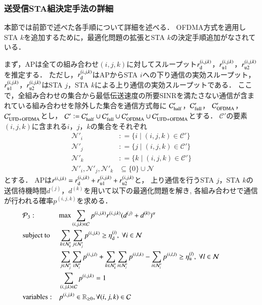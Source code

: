 \documentclass[master]{kuisthesis}		%
\def\equiv{\mathrel{\mathop:}=}
\newcommand{\sijk}{(i,j,k)}
\newcommand{\rijk}{r^{(i,j,k)}}
\newcommand{\mthcd}{{\mathcal C}'}
\newcommand{\mthni}{{\mathcal N}'_i}
\newcommand{\mthnj}{{\mathcal N}'_j}
\newcommand{\mthnk}{{\mathcal N}'_k}
\begin{document}
		\subsubsection{送受信STA組決定手法の詳細}
			本節では前節で述べた各手順について詳細を述べる．
			OFDMA方式を適用しSTA $k$を追加するために，最適化問題の拡張とSTA $k$の決定手順追加がなされている．
			\par
			まず，APは全ての組み合わせ$(i,j,k)$に対してスループット$r^{(i,j,k)}_{\rm d}$，$r^{(i,j,k)}_{\rm u1}$，$r^{(i,j,k)}_{\rm u2}$を推定する．
			ただし，$r^{(i,j,k)}_{\rm d}$はAPからSTA $i$への下り通信の実効スループット，$r^{(i,j,k)}_{\rm u1}$，$r^{(i,j,k)}_{\rm u2}$はSTA $j$，STA $k$による上り通信の実効スループットである．
			ここで，全組み合わせの集合から最低伝送速度の所要SINRを満たさない通信が含まれている組み合わせを除外した集合を通信方式毎に
			${\mathcal C}'_{\rm half}$，${\mathcal C}'_{\rm full}$，
			${\mathcal C}'_{\rm OFDMA}$，${\mathcal C}'_{\rm UFD+OFDMA}$とし，
			${\mathcal C}'\equiv{\mathcal C}'_{\rm half}\cup{\mathcal C}'_{\rm full}\cup{\mathcal C}'_{\rm OFDMA}\cup{\mathcal C}'_{\rm UFD+OFDMA}$とする．
			$\mthcd$の要素$\sijk$に含まれる$i$，$j$，$k$の集合をそれぞれ
			\begin{align}
				\mthni &\equiv\{i\mid\sijk\in\mthcd\}\\
				\mthnj &\equiv\{j\mid\sijk\in\mthcd\}\\
				\mthnk &\equiv\{k\mid\sijk\in\mthcd\}\\
				\mthni,\mthnj,\mthnk&\subseteq \{0\}\cup{\mathcal N}
			\end{align}
			とする．
			APは$\rijk=r^{(i,j,k)}_{\rm d}+r^{(i,j,k)}_{\rm u1}+r^{(i,j,k)}_{\rm u2}$と，
			上り通信を行うSTA $j$，STA $k$の送信待機時間$d^{(j)}$，$d^{(k)}$を用いて以下の最適化問題を解き,
			各組み合わせで通信が行われる確率$p^{(i,j,k)}$を求める．
			\begin{align}
				&{\mathcal P}_3: && {\rm max} \sum_{(i,j,k)\in{\mathcal C}} p^{(i,j,k)}r^{(i,j,k)}(d^{(j)}+d^{(k)})^{\alpha} &&&&&&\\
				&{\rm subject\ to} && \sum_{k\in\mthnk} \sum_{j\in\mthnj} p^{(i,j,k)} \geq \eta_{\rm d}^{(i)},\ \forall i\in {\mathcal N} \label{eq:etad} \\
				&&& \sum_{j\in\mthnj} \sum_{i\mthni} p^{(i,j,l)}+\sum_{k\in\mthnk} \sum_{i\in\mthni} p^{(i,l,k)}- \sum_{i\in\mthni} p^{(i,l,l)} \geq \eta_{\rm u}^{(l)},\ \forall l\in {\mathcal N} \label{eq:etau} \\
				&&& \sum_{(i,j,k)\in{\mathcal C}} p^{(i,j,k)}=1 \\
				&{\rm variables:} &&p^{(i,j,k)} \in {\mathbb R}_{\geq 0},\forall(i,j,k)\in {\mathcal C}
			\end{align}
\end{document}
